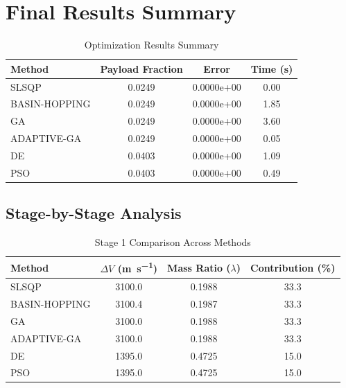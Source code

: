 \documentclass{article}
\begin{document}
\section{Final Results Summary}
\begin{table}[H]
\centering
\caption{Optimization Results Summary}
\begin{tabular}{lS[table-format=1.4]S[table-format=1.4e-1]S[table-format=1.2]}
\toprule
Method & {Payload Fraction} & {Error} & {Time (\si{\second})} \\
\midrule
SLSQP        & 0.0249 & 0.0000e+00 & 0.00 \\
BASIN-HOPPING & 0.0249 & 0.0000e+00 & 1.85 \\
GA           & 0.0249 & 0.0000e+00 & 3.60 \\
ADAPTIVE-GA  & 0.0249 & 0.0000e+00 & 0.05 \\
DE           & 0.0403 & 0.0000e+00 & 1.09 \\
PSO          & 0.0403 & 0.0000e+00 & 0.49 \\
\bottomrule
\end{tabular}
\end{table}

\subsection{Stage-by-Stage Analysis}


\begin{table}[H]
\centering
\caption{Stage 1 Comparison Across Methods}
\begin{tabular}{lS[table-format=4.1]S[table-format=1.4]S[table-format=3.1]}
\toprule
Method & {$\Delta V$ (\si{\meter\per\second})} & {Mass Ratio ($\lambda$)} & {Contribution (\%)} \\
\midrule
SLSQP        & 3100.0 & 0.1988 & 33.3 \\
BASIN-HOPPING & 3100.4 & 0.1987 & 33.3 \\
GA           & 3100.0 & 0.1988 & 33.3 \\
ADAPTIVE-GA  & 3100.0 & 0.1988 & 33.3 \\
DE           & 1395.0 & 0.4725 & 15.0 \\
PSO          & 1395.0 & 0.4725 & 15.0 \\
\bottomrule
\end{tabular}
\end{table}
\end{document}

